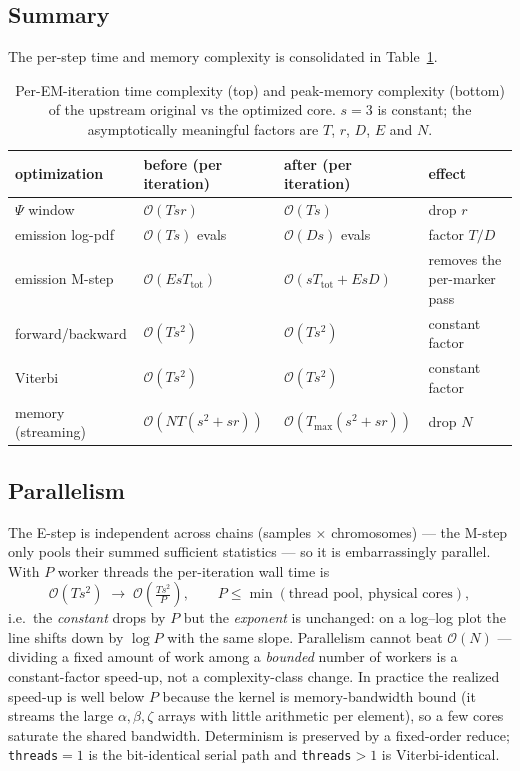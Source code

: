 \documentclass[11pt]{article}
\newcommand{\code}[1]{\texttt{#1}}
\newcommand{\bigO}{\mathcal{O}}
\begin{document}
\subsection{Summary}
The per-step time and memory complexity is consolidated in Table~\ref{tab:complexity}.
\begin{table}[htbp]
\centering
\small
\renewcommand{\arraystretch}{1.25}
\begin{tabular}{@{}l l l l@{}}
\toprule
optimization & before (per iteration) & after (per iteration) & effect \\
\midrule
$\Psi$ window          & $\bigO(T s r)$              & $\bigO(T s)$                          & drop $r$ \\
emission log-pdf       & $\bigO(T s)$ evals         & $\bigO(D s)$ evals                    & factor $T/D$ \\
emission M-step        & $\bigO(E s T_{\text{tot}})$ & $\bigO(s T_{\text{tot}}+E s D)$      & removes the per-marker pass \\
forward/backward       & $\bigO(T s^2)$             & $\bigO(T s^2)$                        & constant factor \\
Viterbi                & $\bigO(T s^2)$             & $\bigO(T s^2)$                        & constant factor \\
\midrule
memory (streaming)     & $\bigO(N T (s^2{+}s r))$   & $\bigO(T_{\max}(s^2{+}s r))$          & drop $N$ \\
\bottomrule
\end{tabular}
\caption{Per-EM-iteration time complexity (top) and peak-memory complexity (bottom)
of the upstream original vs the optimized core. $s=3$ is constant; the
asymptotically meaningful factors are $T$, $r$, $D$, $E$ and $N$.}
\label{tab:complexity}
\end{table}

\subsection{Parallelism}
The E-step is independent across chains (samples $\times$ chromosomes) --- the M-step
only pools their summed sufficient statistics --- so it is embarrassingly parallel.
With $P$ worker threads the per-iteration wall time is
\[
\bigO(T s^2)\;\longrightarrow\;\bigO\!\left(\tfrac{T s^2}{P}\right),
\qquad P \le \min(\text{thread pool},\ \text{physical cores}),
\]
i.e.\ the \emph{constant} drops by $P$ but the \emph{exponent} is unchanged: on a
log--log plot the line shifts down by $\log P$ with the same slope. Parallelism
cannot beat $\bigO(N)$ --- dividing a fixed amount of work among a \emph{bounded}
number of workers is a constant-factor speed-up, not a complexity-class change. In
practice the realized speed-up is well below $P$ because the kernel is
memory-bandwidth bound (it streams the large $\alpha,\beta,\zeta$ arrays with little
arithmetic per element), so a few cores saturate the shared bandwidth. Determinism is
preserved by a fixed-order reduce; \code{threads}$=1$ is the bit-identical serial path
and \code{threads}$>1$ is Viterbi-identical.
\end{document}

